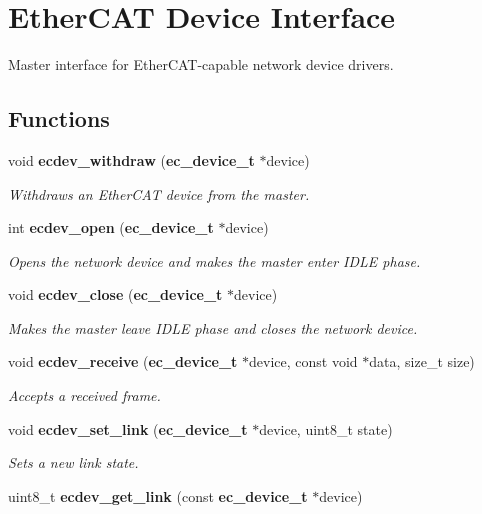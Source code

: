 \section{\-Ether\-C\-A\-T \-Device \-Interface}
\label{group__DeviceInterface}


\-Master interface for \-Ether\-C\-A\-T-\/capable network device drivers.  


\subsection*{\-Functions}
\begin{DoxyCompactItemize}
\item 
void {\bf ecdev\-\_\-withdraw} ({\bf ec\-\_\-device\-\_\-t} $\ast$device)
\begin{DoxyCompactList}\small\item\em \-Withdraws an \-Ether\-C\-A\-T device from the master. \end{DoxyCompactList}\item 
int {\bf ecdev\-\_\-open} ({\bf ec\-\_\-device\-\_\-t} $\ast$device)
\begin{DoxyCompactList}\small\item\em \-Opens the network device and makes the master enter \-I\-D\-L\-E phase. \end{DoxyCompactList}\item 
void {\bf ecdev\-\_\-close} ({\bf ec\-\_\-device\-\_\-t} $\ast$device)
\begin{DoxyCompactList}\small\item\em \-Makes the master leave \-I\-D\-L\-E phase and closes the network device. \end{DoxyCompactList}\item 
void {\bf ecdev\-\_\-receive} ({\bf ec\-\_\-device\-\_\-t} $\ast$device, const void $\ast$data, size\-\_\-t size)
\begin{DoxyCompactList}\small\item\em \-Accepts a received frame. \end{DoxyCompactList}\item 
void {\bf ecdev\-\_\-set\-\_\-link} ({\bf ec\-\_\-device\-\_\-t} $\ast$device, uint8\-\_\-t state)
\begin{DoxyCompactList}\small\item\em \-Sets a new link state. \end{DoxyCompactList}\item 
uint8\-\_\-t {\bf ecdev\-\_\-get\-\_\-link} (const {\bf ec\-\_\-device\-\_\-t} $\ast$device)

\end{DoxyCompactItemize}
